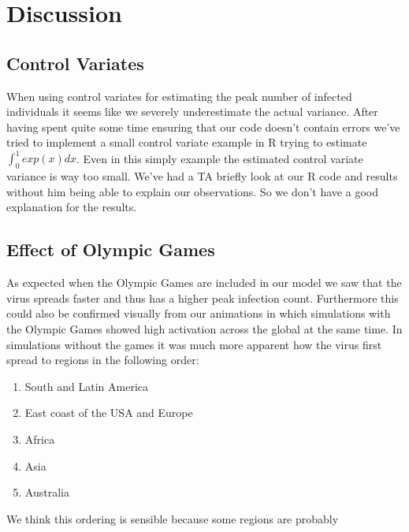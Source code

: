 
\section{Discussion}
\subsection{Control Variates}
When using control variates for estimating the peak number of infected individuals it seems like we severely underestimate the actual variance. After having spent quite some time ensuring that our code doesn't contain errors we've tried to implement a small control variate example in R trying to estimate $\int_0^1 exp(x) dx$. Even in this simply example the estimated control variate variance is way too small. We've had a TA briefly look at our R code and results without him being able to explain our observations. So we don't have a good explanation for the results.

\subsection{Effect of Olympic Games}
As expected when the Olympic Games are included in our model we saw that the virus spreads faster and thus has a higher peak infection count. Furthermore this could also be confirmed visually from our animations in which simulations with the Olympic Games showed high activation across the global at the same time. In simulations without the games it was much more apparent how the virus first spread to regions in the following order:
\begin{enumerate}
	\item South and Latin America
	\item  East coast of the USA and Europe
	\item Africa
	\item Asia
	\item Australia
\end{enumerate}

We think this ordering is sensible because some regions are probably 
